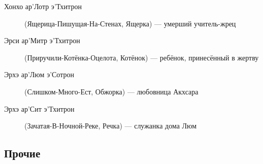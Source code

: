 \documentclass[a4paper,12pt,fleqn]{book}\usepackage{polyglossia}\setdefaultlanguage[babelshorthands=true]{russian}\setotherlanguage{english}\defaultfontfeatures{Ligatures=TeX,Mapping=tex-text}\usepackage{xcolor}\newcommand{\ml}[3]{#2}
\begin{document}
{\begin{description}
\item[Хонхо ар’Лотр э’Тхитрон] (Ящерица-Пишущая-На-Стенах, Ящерка) --- умерший учитель-жрец

\item[Эрси ар’Митр э’Тхитрон] (Приручили-Котёнка-Оцелота, Котёнок) --- ребёнок, принесённый в жертву
\item[Эрхэ ар’Люм э’Сотрон] (Слишком-Много-Ест, Обжорка) --- любовница Акхсара
\item[Эрхэ ар’Сит э’Тхитрон] (Зачатая-В-Ночной-Реке, Речка) --- служанка дома Люм
\end{description}

\subsection{Прочие}

}
\end{document}
